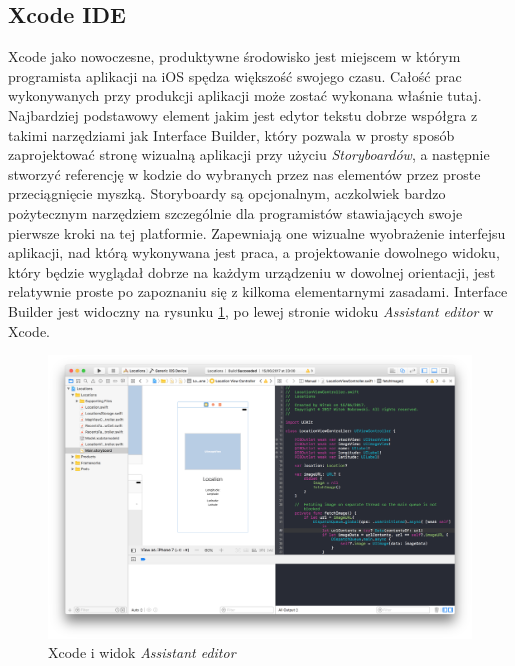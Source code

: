 \subsection{Xcode IDE}

Xcode jako nowoczesne, produktywne środowisko jest miejscem w którym programista aplikacji na iOS spędza większość swojego czasu. Całość prac wykonywanych przy produkcji aplikacji może zostać wykonana właśnie tutaj. Najbardziej podstawowy element jakim jest edytor tekstu dobrze współgra z takimi narzędziami jak Interface Builder, który pozwala w prosty sposób zaprojektować stronę wizualną aplikacji przy użyciu \textit{Storyboardów}, a następnie stworzyć referencję w kodzie do wybranych przez nas elementów przez proste przeciągnięcie myszką. Storyboardy są opcjonalnym, aczkolwiek bardzo pożytecznym narzędziem szczególnie dla programistów stawiających swoje pierwsze kroki na tej platformie. Zapewniają one wizualne wyobrażenie interfejsu aplikacji, nad którą wykonywana jest praca, a projektowanie dowolnego widoku, który będzie wyglądał dobrze na każdym urządzeniu w dowolnej orientacji, jest relatywnie proste po zapoznaniu się z kilkoma elementarnymi zasadami. Interface Builder jest widoczny na rysunku \ref{fig:xcodeassistant}, po lewej stronie widoku \textit{Assistant editor} w Xcode.

\begin{figure}[ht!]
  \centering
  \includegraphics[width=120mm]{images/chapter-2-image-2-xcode.png}
  \caption{Xcode i widok \textit{Assistant editor}}
  \label{fig:xcodeassistant}
\end{figure}

